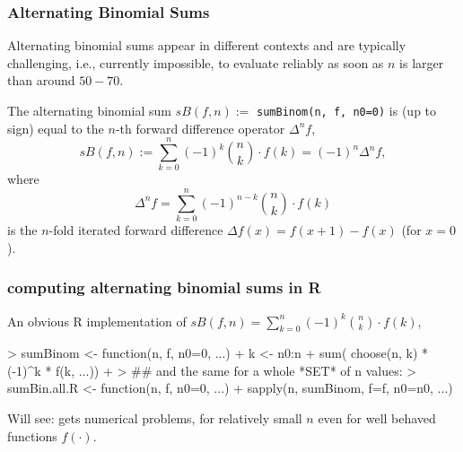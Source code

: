 



\begin{frame}\frametitle{Alternating Binomial Sums}
Alternating binomial sums
appear in different contexts and are typically challenging,
i.e., currently impossible, to evaluate reliably as soon as $n$ is
larger than around $50 - 70$.

The alternating binomial sum $sB(f,n) :=$ \texttt{sumBinom(n, f, n0=0)} is
(up to sign) equal to the $n$-th forward difference operator $\Delta^n f$,
\begin{equation} \label{eq:sumBin}
 sB(f,n) := \sum_{k=0}^{n} (-1)^k {n \choose k}\cdot f(k) = (-1)^n \Delta^n f,
\end{equation}
where
\begin{equation}
  \label{eq:sumBin2}
  \Delta^n f = \sum_{k=0}^{n} (-1)^{n-k}{n \choose k}\cdot f(k)
\end{equation}
is the $n$-fold iterated forward difference
$\Delta f(x) = f(x+1) - f(x)$  (for $x = 0$).
\end{frame}

\begin{frame}[fragile]\frametitle{computing alternating binomial sums in R}
An obvious R implementation of
\(
 sB(f,n) = \sum_{k=0}^{n} (-1)^k {n \choose k}\cdot f(k)
\),
\medskip

\begin{Schunk}
\begin{Sinput}
> sumBinom <- function(n, f, n0=0, ...) {
+   k <- n0:n
+   sum( choose(n, k) * (-1)^k * f(k, ...))
+ }
> ## and the same for a whole *SET* of  n  values:
> sumBin.all.R <- function(n, f, n0=0, ...)
+    sapply(n, sumBinom, f=f, n0=n0, ...)
\end{Sinput}
\end{Schunk}
\bigskip

Will see: gets numerical problems, for relatively small $n$ even for well
behaved functions $f(\cdot)$.
\end{frame}


